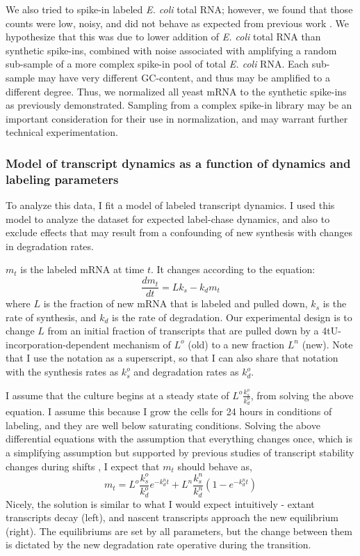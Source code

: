 We also tried to spike-in labeled \textit{E. coli} total RNA; 
however, we found
that those counts were low, noisy, and did not behave as expected
from previous work \parencite{neymotin2014determination}. We
hypothesize that this was due to lower addition of \textit{E. coli} 
total RNA than synthetic spike-ins, 
combined with noise associated with amplifying a
random sub-sample of a more complex spike-in pool of total \textit{E.
coli} RNA. Each sub-sample may have very different GC-content, and
thus may be amplified to a different degree.
Thus, we normalized all yeast mRNA to the synthetic spike-ins as
previously demonstrated.
Sampling from a complex spike-in library may be an important
consideration for their use in normalization, and may warrant further
technical experimentation.

\subsubsection{Model of transcript dynamics as a function of 
dynamics and labeling parameters}

To analyze this data, I fit a model of 
labeled transcript dynamics.
I used this model to analyze the dataset for expected label-chase
dynamics, and also to exclude effects that may result from a
confounding of new synthesis with changes in degradation rates.

\(m_t\) is the labeled mRNA at time \(t\). It changes according to the
equation: \[ \frac{d m_t}{dt} = L k_s - k_d m_t\] where \(L\) is the
fraction of new mRNA that is labeled and pulled down, \(k_s\) is the
rate of synthesis, and \(k_d\) is the rate of degradation. Our
experimental design is to change \(L\) from an initial fraction of
transcripts that are pulled down by a 4tU-incorporation-dependent
mechanism of \(L^o\) (old) to a new fraction \(L^n\) (new). Note that
I use the notation as a superscript, so that I can also share that
notation with the synthesis rates as \(k_s^o\) and degradation rates as
\(k_d^o\).

I assume that the culture begins at a steady state of
\(L^{o}\frac{k_s^{o}}{k_d^{o}}\), from solving the above equation.
I assume this because I grow the cells for 24 hours in conditions
of labeling, and they are well below saturating conditions.
Solving the above differential equations with the assumption that
everything changes once, which is a simplifying assumption but supported
by previous studies of transcript stability changes during shifts
\parencite{perez2013eukaryotic}, I expect that \(m_t\) should behave
as, \[ m_t = L^o \frac{k_s^o}{k_d^o} e^{-k_d^n t} + 
  L^n\frac{k_s^n}{k_d^n}(1-e^{-k_d^n t}) \] Nicely, the solution is
similar to what I would expect intuitively - extant transcripts decay
(left), and nascent transcripts approach the new equilibrium (right).
The equilibriums are set by all parameters, but the change between them
is dictated by the new degradation rate operative during the transition.

